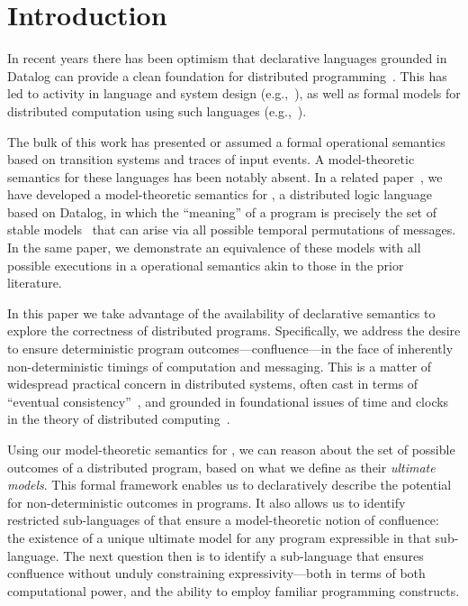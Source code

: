 \section{Introduction}

In recent years there has been optimism that declarative languages grounded in
Datalog can provide a clean foundation for distributed
programming~\cite{declarative-imperative}.  This has led to activity in language
and system design (e.g.,~\cite{boom,Belaramani:2009,Chu:2007,Loo2009-CACM}), as well as formal
models for distributed computation using such
languages (e.g.,~\cite{relational-transducers,navarro-oper-sem,card-abstraction}).

The bulk of this work has presented or assumed a formal operational semantics based on transition systems
and traces of input events.  A model-theoretic semantics for these languages has been notably absent.
In a related paper~\cite{ameloot-operational}, we have developed a model-theoretic
semantics for \lang, a distributed logic language based on Datalog, in which the ``meaning''
of a program is precisely the set of stable models~\cite{sacca-zaniolo} that can arise via all possible temporal permutations of messages. %
In the same paper, we demonstrate an equivalence of these models with all possible executions in a operational semantics akin to those in the prior literature.

In this paper we take advantage of the availability of declarative semantics to explore the correctness of distributed programs.  Specifically, we address the desire to ensure deterministic program outcomes---confluence---in the face of inherently non-deterministic timings of computation and messaging.  This is a matter of widespread practical concern in distributed systems, often cast in terms of ``eventual consistency''~\cite{doug-terry,bayou}, and grounded in foundational issues of time and clocks in the theory of distributed computing~\cite{timeclocks}.  

Using our model-theoretic semantics for
\lang, we can reason about the set of possible outcomes of a distributed program, based on what we define  as their \emph{ultimate models}.  This formal framework enables us to declaratively describe the potential for non-deterministic outcomes in \lang programs.  It also allows us to identify restricted sub-languages of \lang that ensure a model-theoretic notion of confluence: the existence of a unique ultimate model for any program expressible in that sub-language. The next question then is to identify a sub-language that ensures confluence without unduly constraining expressivity---both in terms of both computational power, and the ability to employ familiar programming constructs.

